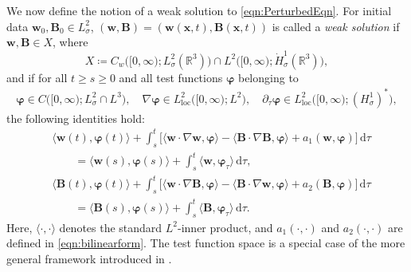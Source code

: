 \documentclass[10pt]{amsart}
\theoremstyle{plain}
\theoremstyle{definition}
\theoremstyle{remark}
\numberwithin{equation}{section}
\newcommand{\R}{\mathbb{R}}
\newcommand{\bx}{\boldsymbol{x}}
\newcommand{\bw}{{\boldsymbol{w}}}
\newcommand{\bB}{{\boldsymbol{B}}}
\newcommand{\vp}{\varphi}
\begin{document}
We now define the notion of a weak solution to \cref{eqn:PerturbedEqn}.
For initial data $\bw_0, \bB_0\in L^2_{\sigma}$, $(\bw,\bB)=(\bw(\bx,t),\bB(\bx,t))$ is called a \textit{weak solution} if $\bw,\bB\in X$, where
\[
X\coloneqq C_w \big( [0,\infty); L^2_\sigma (\R^3)\big)\cap L^2\big([0,\infty); \dot H_\sigma^1(\R^3)\big),
\]
and if for all $t\geq s\geq 0$ and all test functions $\boldsymbol{\vp}$ belonging to
\begin{align}\label{eqn:testfcnspace}
\boldsymbol{\vp} \in C\big( [0, \infty); L^2_\sigma \cap L^3 \big), \quad 
\nabla \boldsymbol{\vp} \in L^2_{\mathrm{loc}}\big( [0,\infty); L^2 \big), \quad 
\partial_\tau \boldsymbol{\vp} \in L^2_{\mathrm{loc}}\big( [0,\infty); (H^1_\sigma)^* \big),
\end{align}
the following identities hold:
\begin{equation}\label{eqn:weak}
\begin{aligned}
&\langle \bw(t), \boldsymbol{\varphi}(t)  \rangle
+\int_s^t \Big[ 
\langle \bw\cdot  \nabla \bw, \boldsymbol{\varphi} \rangle
- \langle \bB\cdot  \nabla \bB, \boldsymbol{\varphi} \rangle
+ a_1(\bw,\boldsymbol{\vp})
\Big]\, \mathrm d\tau 
\\ &\qquad= \langle \bw(s), \boldsymbol{\varphi}(s)  \rangle 
+ \int_s^t \langle \bw, \boldsymbol{\varphi}_\tau \rangle \, \mathrm d\tau,\\
&\langle \bB(t), \boldsymbol{\varphi}(t)  \rangle
+\int_s^t \Big[ 
\langle \bw\cdot  \nabla \bB, \boldsymbol{\varphi} \rangle
-\langle \bB\cdot  \nabla \bw, \boldsymbol{\varphi} \rangle
+ a_2(\bB,\boldsymbol{\vp})
 \Big]\, \mathrm d\tau 
 \\ &\qquad= \langle \bB(s), \boldsymbol{\varphi}(s)  \rangle 
 + \int_s^t \langle \bB, \boldsymbol{\varphi}_\tau \rangle \, \mathrm d\tau.
\end{aligned}
\end{equation}
Here, $\langle \cdot,\cdot \rangle$ denotes the standard $L^2$-inner product, and $a_1(\cdot,\cdot)$ and $a_2(\cdot,\cdot)$ are defined in \cref{eqn:bilinearform}.
The test function space is a special case of the more general framework introduced in \cite[eq.~(2.16)]{HishidaSchonbek16}. 
\end{document}
